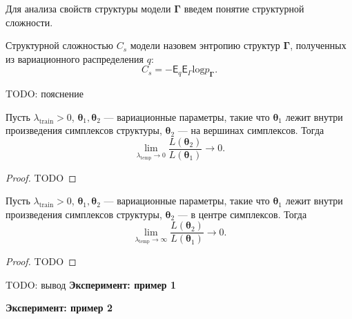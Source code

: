 Для анализа свойств структуры модели $\boldsymbol{\Gamma}$ введем понятие структурной сложности.
\begin{defin}
Структурной сложностью $C_s$ модели назовем энтропию структур $\boldsymbol{\Gamma}$, полученных из вариационного распределения $q$:
\[
    C_s = -\mathsf{E}_q \mathsf{E}_\Gamma \text{log} p_{\boldsymbol{\Gamma}}.
\]
\end{defin}
TODO: пояснение

\begin{theorem}
Пусть $\lambda_{\text{train}} >0$, $\boldsymbol{\theta}_1, \boldsymbol{\theta}_2$ --- вариационные параметры, такие что $\boldsymbol{\theta}_1$ лежит внутри произведения симплексов структуры, $\boldsymbol{\theta}_2$ --- на вершинах симплексов.
Тогда \[
\lim_{\lambda_\text{temp} \to 0} \frac{L(\boldsymbol{\theta}_2)}{L(\boldsymbol{\theta}_1)} \to 0.
\]
\end{theorem}
\begin{proof}
TODO
\end{proof}
\begin{theorem}
Пусть $\lambda_{\text{train}} >0$, $\boldsymbol{\theta}_1, \boldsymbol{\theta}_2$ --- вариационные параметры, такие что $\boldsymbol{\theta}_1$ лежит внутри произведения симплексов структуры, $\boldsymbol{\theta}_2$ --- в центре симплексов.
Тогда \[
\lim_{\lambda_\text{temp} \to \infty} \frac{L(\boldsymbol{\theta}_2)}{L(\boldsymbol{\theta}_1)} \to 0.
\]
\end{theorem}
\begin{proof}
TODO
\end{proof}
TODO: вывод
\textbf{Эксперимент: пример 1}

\textbf{Эксперимент: пример 2}







